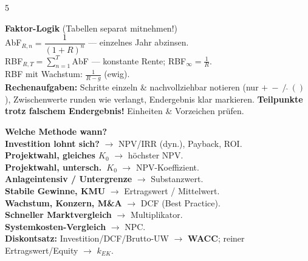 \documentclass[10pt,a4paper,landscape]{extarticle}
\newcommand{\K}[1]{\textbf{\color{cB}#1}}
\newcommand{\R}[1]{\textbf{\color{red!72!black}#1}}
\begin{document}
\begin{multicols}{5}
\begin{tcolorbox}[colback=cBox,colframe=cA,boxrule=0.35pt,left=2.5pt,right=2.5pt,top=2pt,bottom=2pt,arc=1pt]
\textbf{Faktor-Logik} (Tabellen separat mitnehmen!)\\
AbF$_{R,n}=\dfrac{1}{(1+R)^n}$ — einzelnes Jahr abzinsen.\\
RBF$_{R,T}=\sum_{n=1}^{T}$AbF — konstante Rente; RBF$_\infty=\tfrac1R$.\\
RBF mit Wachstum: $\tfrac{1}{R-g}$ (ewig).\\[3pt]
\textbf{Rechenaufgaben:} Schritte einzeln \& nachvollziehbar notieren (nur $+\ -\ /\ \hat{}\ ()$ ), Zwischenwerte runden wie verlangt, Endergebnis klar markieren. \R{Teilpunkte trotz falschem Endergebnis!} Einheiten \& Vorzeichen prüfen.
\end{tcolorbox}

\begin{tcolorbox}[colback=cEx,colframe=cB!70!black,boxrule=0.35pt,left=2.5pt,right=2.5pt,top=2pt,bottom=2pt,arc=1pt]
\textbf{Welche Methode wann?}\\
\R{Investition lohnt sich?} $\to$ NPV/IRR (dyn.), Payback, ROI.\\
\R{Projektwahl, gleiches $K_0$} $\to$ höchster NPV.\\
\R{Projektwahl, untersch.\ $K_0$} $\to$ NPV-Koeffizient.\\
\R{Anlageintensiv / Untergrenze} $\to$ Substanzwert.\\
\R{Stabile Gewinne, KMU} $\to$ Ertragswert / Mittelwert.\\
\R{Wachstum, Konzern, M\&A} $\to$ DCF (Best Practice).\\
\R{Schneller Marktvergleich} $\to$ Multiplikator.\\
\R{Systemkosten-Vergleich} $\to$ NPC.\\[3pt]
\textbf{Diskontsatz:} Investition/DCF/Brutto-UW $\to$ \K{WACC}; reiner Ertragswert/Equity $\to$ \K{$k_{EK}$}.
\end{tcolorbox}


\end{multicols}
\end{document}
